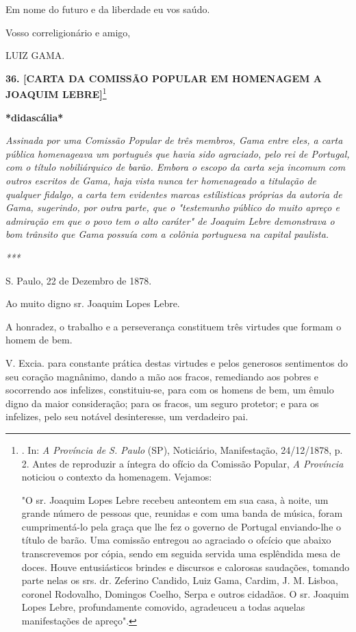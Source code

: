Em nome do futuro e da liberdade eu vos saúdo.

Vosso correligionário e amigo,

LUIZ GAMA.

\textbf{36. {[}CARTA DA COMISSÃO POPULAR EM HOMENAGEM A JOAQUIM
LEBRE{]}}\footnote{. In: \emph{A Província de S. Paulo} (SP),
  Noticiário, Manifestação, 24/12/1878, p. 2. Antes de reproduzir a
  íntegra do ofício da Comissão Popular, \emph{A Província} noticiou o
  contexto da homenagem. Vejamos:

  "O sr. Joaquim Lopes Lebre recebeu anteontem em sua casa, à noite, um
  grande número de pessoas que, reunidas e com uma banda de música,
  foram cumprimentá-lo pela graça que lhe fez o governo de Portugal
  enviando-lhe o título de barão. Uma comissão entregou ao agraciado o
  ofcício que abaixo transcrevemos por cópia, sendo em seguida servida
  uma esplêndida mesa de doces. Houve entusiásticos brindes e discursos
  e calorosas saudações, tomando parte nelas os srs. dr. Zeferino
  Candido, Luiz Gama, Cardim, J. M. Lisboa, coronel Rodovalho, Domingos
  Coelho, Serpa e outros cidadãos. O sr. Joaquim Lopes Lebre,
  profundamente comovido, agradeuceu a todas aquelas manifestações de
  apreço".}

\textbf{*}\protect\hypertarget{Secao_Sem_Titulo-49}{}{}\textbf{didascália*}

\emph{Assinada por uma Comissão Popular de três membros, Gama entre
eles, a carta pública homenageava um português que havia sido agraciado,
pelo rei de Portugal, com o título nobiliárquico de barão. Embora o
escopo da carta seja incomum com outros escritos de Gama, haja vista
nunca ter homenageado a titulação de qualquer fidalgo, a carta tem
evidentes marcas estílisticas próprias da autoria de Gama, sugerindo,
por outra parte, que o "testemunho público do muito apreço e admiração
em que o povo tem o alto caráter" de Joaquim Lebre demonstrava o bom
trânsito que Gama possuía com a colônia portuguesa na capital paulista.}

\emph{***}

S. Paulo, 22 de Dezembro de 1878.

Ao muito digno sr. Joaquim Lopes Lebre.

A honradez, o trabalho e a perseverança constituem três virtudes que
formam o homem de bem.

V. Excia. para constante prática destas virtudes e pelos generosos
sentimentos do seu coração magnânimo, dando a mão aos fracos, remediando
aos pobres e socorrendo aos infelizes, constituiu-se, para com os homens
de bem, um êmulo digno da maior consideração; para os fracos, um seguro
protetor; e para os infelizes, pelo seu notável desinteresse, um
verdadeiro pai.

